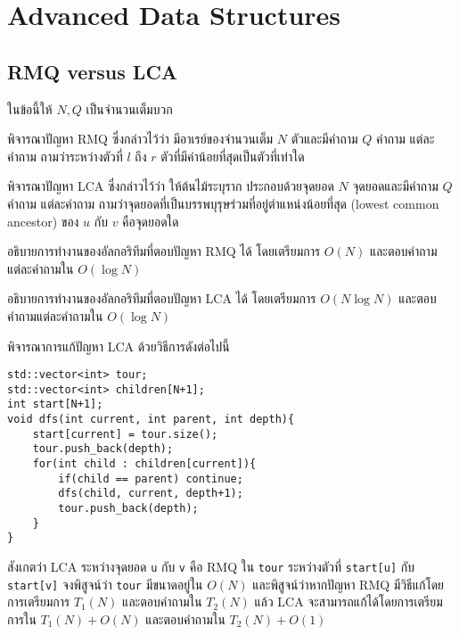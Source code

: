 \chapter{Advanced Data Structures}

\section{RMQ versus LCA}

ในข้อนี้ให้ $N, Q$ เป็นจำนวนเต็มบวก

พิจารณาปัญหา RMQ ซึ่งกล่าวไว้ว่า มีอาเรย์ของจำนวนเต็ม $N$ ตัวและมีคำถาม $Q$ คำถาม แต่ละคำถาม ถามว่าระหว่างตัวที่ $l$ ถึง $r$ ตัวที่มีค่าน้อยที่สุดเป็นตัวที่เท่าใด

พิจารณาปัญหา LCA ซึ่งกล่าวไว้ว่า ให้ต้นไม้ระบุราก ประกอบด้วยจุดยอด $N$ จุดยอดและมีคำถาม $Q$ คำถาม แต่ละคำถาม ถามว่าจุดยอดที่เป็นบรรพบุรุษร่วมที่อยู่ตำแหน่งน้อยที่สุด (lowest common ancestor) ของ $u$ กับ $v$ คือจุดยอดใด

\begin{exercise}
อธิบายการทำงานของอัลกอริทึมที่ตอบปัญหา RMQ ได้ โดยเตรียมการ $O(N)$ และตอบคำถามแต่ละคำถามใน $O(\log N)$
\end{exercise}

\begin{exercise}
อธิบายการทำงานของอัลกอริทึมที่ตอบปัญหา LCA ได้ โดยเตรียมการ $O(N \log N)$ และตอบคำถามแต่ละคำถามใน $O(\log N)$
\end{exercise}

พิจารณาการแก้ปัญหา LCA ด้วยวิธีการดังต่อไปนี้

\begin{lstlisting}
std::vector<int> tour;
std::vector<int> children[N+1];
int start[N+1];
void dfs(int current, int parent, int depth){
    start[current] = tour.size();
    tour.push_back(depth);
    for(int child : children[current]){
        if(child == parent) continue;
        dfs(child, current, depth+1);
        tour.push_back(depth);
    }
}
\end{lstlisting}

\begin{exercise}
สังเกตว่า LCA ระหว่างจุดยอด \texttt{u} กับ \texttt{v} คือ RMQ ใน \texttt{tour} ระหว่างตัวที่ \texttt{start[u]} กับ \texttt{start[v]} จงพิสูจน์ว่า \texttt{tour} มีขนาดอยู่ใน $O(N)$ และพิสูจน์ว่าหากปัญหา RMQ มีวิธีแก้โดยการเตรียมการ $T_1(N)$ และตอบคำถามใน $T_2(N)$ แล้ว LCA จะสามารถแก้ได้โดยการเตรียมการใน $T_1(N) + O(N)$ และตอบคำถามใน $T_2(N) + O(1)$
\end{exercise}

